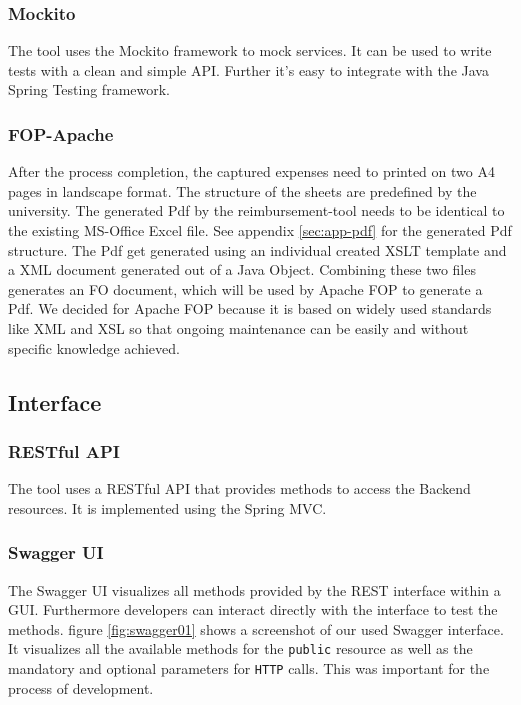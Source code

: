 \subsubsection{Mockito}
The tool uses the Mockito framework to mock services. It can be used to write tests with a clean and simple API. Further it's easy to integrate with the Java Spring Testing framework. \cite{mockito}

\subsubsection{FOP-Apache}
After the process completion, the captured expenses need to printed on two A4 pages in landscape format. The structure of the sheets are predefined by the university. The generated Pdf by the reimbursement-tool needs to be identical to the existing MS-Office Excel file. See appendix \ref{sec:app-pdf} for the generated Pdf structure.\newline
The Pdf get generated using an individual created XSLT template and a XML document generated out of a Java Object. Combining these two files generates an FO document, which will be used by Apache FOP \cite{apache-fop} to generate a Pdf.\newline
We decided for Apache FOP because it is based on widely used standards like XML and XSL so that ongoing maintenance can be easily and without specific knowledge achieved.

\subsection{Interface}

\subsubsection{RESTful API}
\label{sec:restfulapi}
The tool uses a RESTful API that provides methods to access the Backend resources. It is implemented using the Spring MVC. 

\subsubsection{Swagger UI}
The Swagger UI visualizes all methods provided by the REST interface within a GUI. Furthermore developers can interact directly with the interface to test the methods. figure \ref{fig:swagger01} shows a screenshot of our used Swagger interface. It visualizes all the available methods for the \texttt{public} resource as well as the mandatory and optional parameters for \texttt{HTTP} calls. This was important for the process of development. \cite{swagger}

